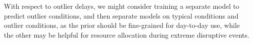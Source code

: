 \documentclass{chaistyle}
\begin{document}
With respect to outlier delays, we might consider training a separate model to predict outlier conditions, and then separate models on typical conditions and outlier conditions, as the prior should be fine-grained for day-to-day use, while the other may be helpful for resource allocation during extreme disruptive events.


\end{document}
